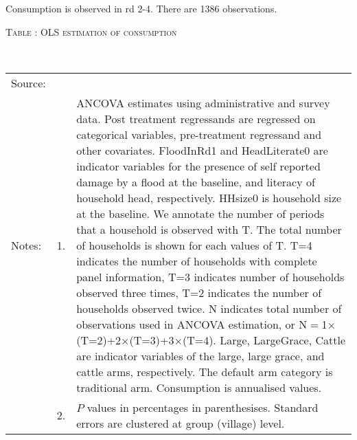 Consumption is observed in rd 2-4. There are 1386 observations. 









\hspace{-1cm}\begin{minipage}[t]{14cm}
\hfil\textsc{\normalsize Table \thetable: OLS estimation of consumption\label{tab ANCOVA consumption}}\\
\setlength{\tabcolsep}{1pt}
\setlength{\baselineskip}{8pt}
\renewcommand{\arraystretch}{.55}
\hfil{}\\
\renewcommand{\arraystretch}{.8}
\setlength{\tabcolsep}{1pt}
\begin{tabular}{>{\hfill\scriptsize}p{1cm}<{}>{\hfill\scriptsize}p{.25cm}<{}>{\scriptsize}p{12cm}<{\hfill}}
Source:& \multicolumn{2}{l}{\scriptsize Estimated with GUK administrative and survey data of round 2 - 4.}\\
Notes: & 1. & ANCOVA estimates using administrative and survey data. Post treatment regressands are regressed on categorical variables, pre-treatment regressand and other covariates. \textsf{FloodInRd1} and \textsf{HeadLiterate0} are indicator variables for the presence of self reported damage by a flood at the baseline, and literacy of household head, respectively. \textsf{HHsize0} is household size at the baseline. We annotate the number of periods that a household is observed with \textsf{T}. The total number of households is shown for each values of \textsf{T}. \textsf{T=4} indicates the number of households with complete panel information, \textsf{T=3} indicates number of households observed three times, \textsf{T=2} indicates the number of households observed twice. \textsf{N} indicates total number of observations used in ANCOVA estimation, or \textsf{N$=$1$\times$(T=2)+2$\times$(T=3)+3$\times$(T=4)}.  \textsf{Large}, \textsf{LargeGrace}, \textsf{Cattle} are indicator variables of the \textsf{large}, \textsf{large grace}, and \textsf{cattle} arms, respectively. The default arm category is \textsf{traditional} arm. Consumption is annualised values. \\
& 2. & $P$ values in percentages in parenthesises. Standard errors are clustered at group (village) level.
\end{tabular}
\end{minipage}

